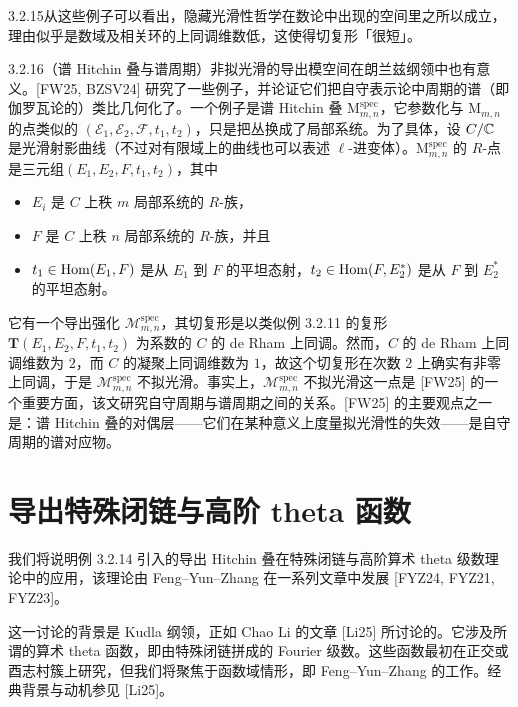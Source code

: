 \begin{rem}{3.2.15}从这些例子可以看出，隐藏光滑性哲学在数论中出现的空间里之所以成立，理由似乎是数域及相关环的上同调维数低，这使得切复形「很短」。
\end{rem}

\begin{exam}{3.2.16}（谱 Hitchin 叠与谱周期）非拟光滑的导出模空间在朗兰兹纲领中也有意义。[FW25, BZSV24] 研究了一些例子，并论证它们把自守表示论中周期的谱（即伽罗瓦论的）类比几何化了。一个例子是谱 Hitchin 叠 $\mathrm{M}^{\mathrm{spec}}_{m,n}$，它参数化与 $\mathrm{M}_{m,n}$ 的点类似的 $(\mathcal E_1,\mathcal E_2,\mathcal F,t_1,t_2)$，只是把丛换成了局部系统。为了具体，设 $C/\mathbb{C}$ 是光滑射影曲线（不过对有限域上的曲线也可以表述 $\ell$-进变体）。$\mathrm{M}^{\mathrm{spec}}_{m,n}$ 的 $R$-点是三元组$(E_1,E_2,F,t_1,t_2)$，其中
\begin{itemize}
\item $E_i$ 是 $C$ 上秩 $m$ 局部系统的 $R$-族，
\item $F$ 是 $C$ 上秩 $n$ 局部系统的 $R$-族，并且
\item $t_1\in\operatorname{Hom}(E_1,F)$ 是从 $E_1$ 到 $F$ 的平坦态射，$t_2\in\operatorname{Hom}(F,E_2^*)$ 是从 $F$ 到 $E_2^*$ 的平坦态射。
\end{itemize}
它有一个导出强化 $\mathcal M^{\mathrm{spec}}_{m,n}$，其切复形是以类似例 3.2.11 的复形 $\mathbf T(E_1,E_2,F,t_1,t_2)$ 为系数的 $C$ 的 de Rham 上同调。然而，$C$ 的 de Rham 上同调维数为 $2$，而 $C$ 的凝聚上同调维数为 $1$，故这个切复形在次数 $2$ 上确实有非零上同调，于是 $\mathcal M^{\mathrm{spec}}_{m,n}$ 不拟光滑。事实上，$\mathcal M^{\mathrm{spec}}_{m,n}$ 不拟光滑这一点是 [FW25] 的一个重要方面，该文研究自守周期与谱周期之间的关系。[FW25] 的主要观点之一是：谱 Hitchin 叠的对偶层——它们在某种意义上度量拟光滑性的失效——是自守周期的谱对应物。
\end{exam}

\section{导出特殊闭链与高阶 theta 函数}

我们将说明例 3.2.14 引入的导出 Hitchin 叠在特殊闭链与高阶算术 theta 级数理论中的应用，该理论由 Feng–Yun–Zhang 在一系列文章中发展 [FYZ24, FYZ21, FYZ23]。

这一讨论的背景是 Kudla 纲领，正如 Chao Li 的文章 [Li25] 所讨论的。它涉及所谓的算术 theta 函数，即由特殊闭链拼成的 Fourier 级数。这些函数最初在正交或酉志村簇上研究，但我们将聚焦于函数域情形，即 Feng–Yun–Zhang 的工作。经典背景与动机参见 [Li25]。

